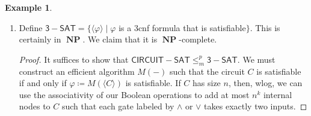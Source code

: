 \documentclass[10pt,letterpaper,cm]{nupset}
\theoremstyle{definition}
\newtheorem{exmp}[definition]{Example}
\theoremstyle{theorem}
\theoremstyle{remark}
\newcommand{\1}{\mathbf{1}}
\newcommand{\0}{\vec 0}
\DeclareMathOperator{\NP}{\mathbf{NP}}
\begin{document}
\begin{exmp} $ $
\begin{enumerate}
\item Define $\mathsf{3{-}SAT}= \{\langle \varphi \rangle \mid \varphi$ is a 3cnf formula that is satisfiable$\}$. This is certainly in $\NP$. We claim that it is $\NP$-complete.
\begin{proof}
It suffices to show that $\mathsf{CIRCUIT{-}SAT} \leq_m^p \mathsf{3{-}SAT}$. We must construct an efficient algorithm $M( -)$ such that the circuit $C$ is satisfiable  if and only if $\varphi\coloneqq M(\langle C \rangle)$ is satisfiable. If $C$ has size $n$, then, wlog, we can use the associativity of our Boolean operations to add at most $n^k$ internal nodes to $C$ such that each gate labeled by $\land$ or $\vee$ takes exactly two inputs. 


\end{proof}
\end{enumerate}
\end{exmp}
\end{document}

